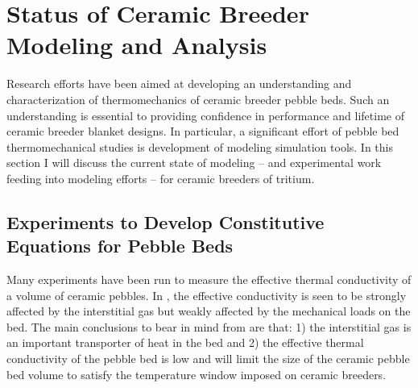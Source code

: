 \FloatBarrier


















\FloatBarrier

%
%
\section{Status of Ceramic Breeder Modeling and Analysis}\label{sec:modeling-state}

Research efforts have been aimed at developing an understanding and characterization of thermomechanics of ceramic breeder pebble beds. Such an understanding is essential to providing confidence in performance and lifetime of ceramic breeder blanket designs. In particular, a significant effort of pebble bed thermomechanical studies is development of modeling simulation tools. In this section I will discuss the current state of modeling -- and experimental work feeding into modeling efforts -- for ceramic breeders of tritium.


\subsection{Experiments to Develop Constitutive Equations for Pebble Beds}




Many experiments have been run to measure the effective thermal conductivity of a volume of ceramic pebbles. In , the effective conductivity is seen to be strongly affected by the interstitial gas but weakly affected by the mechanical loads on the bed. The main conclusions to bear in mind from  are that: 1) the interstitial gas is an important transporter of heat in the bed and 2) the effective thermal conductivity of the pebble bed is low and will limit the size of the ceramic pebble bed volume to satisfy the temperature window imposed on ceramic breeders.

